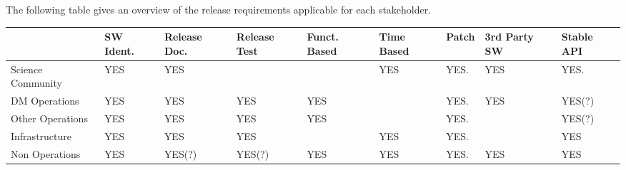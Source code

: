 The following table gives an overview of the release requirements applicable for each stakeholder.

\setlength\LTleft{-0.35in}
\setlength\LTright{-0.5in}
\begin{longtable}{p{2.5cm}p{1.5cm}p{1.5cm}p{1.5cm}p{1.5cm}p{1.5cm}p{1.5cm}p{1.7cm}p{1.5cm}}\hline
& 
SW Ident.            & Release Doc.                  & Release Test & Funct. Based           & Time Based & Patch & 3rd Party SW  & Stable API  \\ \hline
Science Community &
YES                     & YES                                &                       &                                 &  YES            & YES.   & YES               &  YES.          \\ \hline
DM Operations &
YES                     & YES                                & YES               & YES                         &                     & YES.   & YES               &  YES(?)      \\ \hline
Other Operations &
YES                     & YES                                & YES               & YES                         &                     & YES.   &                       &  YES(?)      \\ \hline
Infrastructure &
YES                     & YES                                & YES               &                                 &  YES            & YES.   &                       &  YES           \\ \hline
Non Operations &
YES                     & YES(?)                            & YES(?)          & YES                         &  YES            & YES.   & YES               &  YES          \\ \hline
\hline
\end{longtable}
\setlength\LTleft{0in}
\setlength\LTright{0in}



